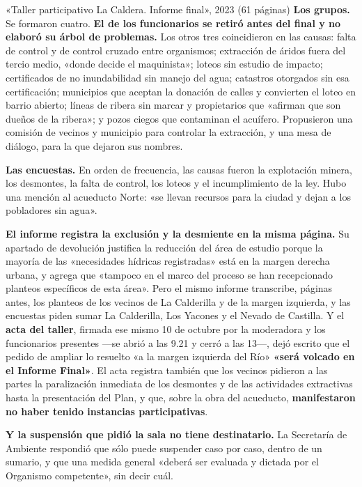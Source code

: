 \begin{ficha}{«Taller participativo La Caldera. Informe final», 2023 (61 páginas)}
\textbf{Los grupos.} Se formaron cuatro. \textbf{El de los funcionarios se retiró antes del final y no elaboró su árbol de problemas.} Los otros tres coincidieron en las causas: falta de control y de control cruzado entre organismos; extracción de áridos fuera del tercio medio, «donde decide el maquinista»; loteos sin estudio de impacto; certificados de no inundabilidad sin manejo del agua; catastros otorgados sin esa certificación; municipios que aceptan la donación de calles y convierten el loteo en barrio abierto; líneas de ribera sin marcar y propietarios que «afirman que son dueños de la ribera»; y pozos ciegos que contaminan el acuífero. Propusieron una comisión de vecinos y municipio para controlar la extracción, y una mesa de diálogo, para la que dejaron sus nombres.

\textbf{Las encuestas.} En orden de frecuencia, las causas fueron la explotación minera, los desmontes, la falta de control, los loteos y el incumplimiento de la ley. Hubo una mención al acueducto Norte: «se llevan recursos para la ciudad y dejan a los pobladores sin agua».
\end{ficha}

\begin{cautela}
\textbf{El informe registra la exclusión y la desmiente en la misma página.} Su apartado de devolución justifica la reducción del área de estudio porque la mayoría de las «necesidades hídricas registradas» está en la margen derecha urbana, y agrega que «tampoco en el marco del proceso se han recepcionado planteos específicos de esta área». Pero el mismo informe transcribe, páginas antes, los planteos de los vecinos de La Calderilla y de la margen izquierda, y las encuestas piden sumar La Calderilla, Los Yacones y el Nevado de Castilla. Y el \textbf{acta del taller}, firmada ese mismo 10 de octubre por la moderadora y los funcionarios presentes ---se abrió a las 9.21 y cerró a las 13---, dejó escrito que el pedido de ampliar lo resuelto «a la margen izquierda del Río» \textbf{«será volcado en el Informe Final»}. El acta registra también que los vecinos pidieron a las partes la paralización inmediata de los desmontes y de las actividades extractivas hasta la presentación del Plan, y que, sobre la obra del acueducto, \textbf{manifestaron no haber tenido instancias participativas}.

\textbf{Y la suspensión que pidió la sala no tiene destinatario.} La Secretaría de Ambiente respondió que sólo puede suspender caso por caso, dentro de un sumario, y que una medida general «deberá ser evaluada y dictada por el Organismo competente», sin decir cuál.
\end{cautela}

